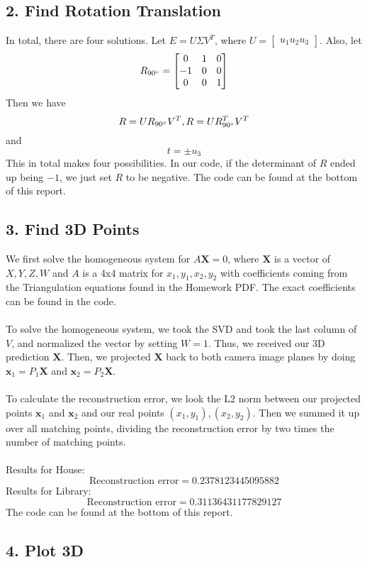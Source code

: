 \documentclass{article}\usepackage{amsmath,amssymb,amsthm,tikz,tkz-graph,color,chngpage,soul,hyperref,csquotes,graphicx,floatrow}\newcommand*{\QEDB}{\hfill\ensuremath{\square}}\newtheorem*{prop}{Proposition}\renewcommand{\theenumi}{\alph{enumi}}\usepackage[shortlabels]{enumitem}\usepackage[nobreak=true]{mdframed}\usetikzlibrary{matrix,calc}\MakeOuterQuote{"}\usepackage[margin=0.95in]{geometry} \newtheorem{theorem}{Theorem}
\begin{document}
\subsection*{2. Find Rotation Translation}
\begin{mdframed}
In total, there are four solutions. Let $ E = U \Sigma V^T$, where $ U =\begin{bmatrix} u_1 u_2 u_3 \end{bmatrix} $. Also, let 
\[ R_{90\degree} =  
\begin{bmatrix}
 0 & 1 & 0 \\
 -1 & 0 & 0 \\
 0 & 0 & 1 \\
\end{bmatrix}
\]
Then we have \[ R = UR_{90\degree}V^T, R = UR_{90\degree}^T V^T \] and \[ t = \pm u_3 \] This in total makes four possibilities. In our code, if the determinant of $ R $ ended up being $ -1 $, we just set $ R $ to be negative. The code can be found at the bottom of this report. 

\end{mdframed}

\subsection*{3. Find 3D Points}
\begin{mdframed}
We first solve the homogeneous system for $ A\textbf{X} =0$, where $ \textbf{X} $ is a vector of $X, Y, Z, W$ and $ A $ is a 4x4 matrix for $ x_1, y_1, x_2, y_2 $ with coefficients coming from the Triangulation equations found in the Homework PDF. The exact coefficients can be found in the code. \\\\ To solve the homogeneous system, we took the SVD and took the last column of $ V $, and normalized the vector by setting $ W =1$. Thus, we received our 3D prediction $ \textbf{X} $. Then, we projected $ \textbf{X} $ back to both camera image planes by doing $ \textbf{x}_1 = P_1 \textbf{X} $ and $  \textbf{x}_2 = P_2 \textbf{X} $.\\\\ To calculate the reconstruction error, we look the L2 norm between our projected points $ \textbf{x}_1 $ and $ \textbf{x}_2 $ and our real points  $ (x_1, y_1), (x_2, y_2) $. Then we summed it up over all matching points, dividing the reconstruction error by two times the number of matching points.\\\\Results for House:
\[ \text{Reconstruction error} = 0.2378123445095882 \] Results for Library:
\[ \text{Reconstruction error} = 0.31136431177829127\] The code can be found at the bottom of this report. 
\end{mdframed}

\subsection*{4. Plot 3D}
\begin{mdframed}

\end{mdframed}
\end{document}
